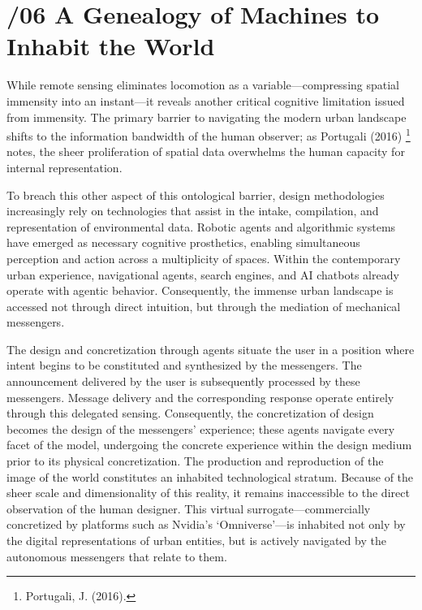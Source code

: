 \documentclass[
  letterpaper,
  DIV=11,
  numbers=noendperiod]{scrreprt}
\begin{document}

\chapter{\texorpdfstring{{/06} A Genealogy of Machines to Inhabit the
World}{/06 A Genealogy of Machines to Inhabit the World}}\label{a-genealogy-of-machines-to-inhabit-the-world-1}

While remote sensing eliminates locomotion as a variable---compressing
spatial immensity into an instant---it reveals another critical
cognitive limitation issued from immensity. The primary barrier to
navigating the modern urban landscape shifts to the information
bandwidth of the human observer; as Portugali (2016) \footnote{Portugali,
  J. (2016).} notes, the sheer proliferation of spatial data overwhelms
the human capacity for internal representation.

To breach this other aspect of this ontological barrier, design
methodologies increasingly rely on technologies that assist in the
intake, compilation, and representation of environmental data. Robotic
agents and algorithmic systems have emerged as necessary cognitive
prosthetics, enabling simultaneous perception and action across a
multiplicity of spaces. Within the contemporary urban experience,
navigational agents, search engines, and AI chatbots already operate
with agentic behavior. Consequently, the immense urban landscape is
accessed not through direct intuition, but through the mediation of
mechanical messengers.

The design and concretization through agents situate the user in a
position where intent begins to be constituted and synthesized by the
messengers. The announcement delivered by the user is subsequently
processed by these messengers. Message delivery and the corresponding
response operate entirely through this delegated sensing. Consequently,
the concretization of design becomes the design of the messengers'
experience; these agents navigate every facet of the model, undergoing
the concrete experience within the design medium prior to its physical
concretization. The production and reproduction of the image of the
world constitutes an inhabited technological stratum. Because of the
sheer scale and dimensionality of this reality, it remains inaccessible
to the direct observation of the human designer. This virtual
surrogate---commercially concretized by platforms such as Nvidia's
`Omniverse'---is inhabited not only by the digital representations of
urban entities, but is actively navigated by the autonomous messengers
that relate to them.
\end{document}
